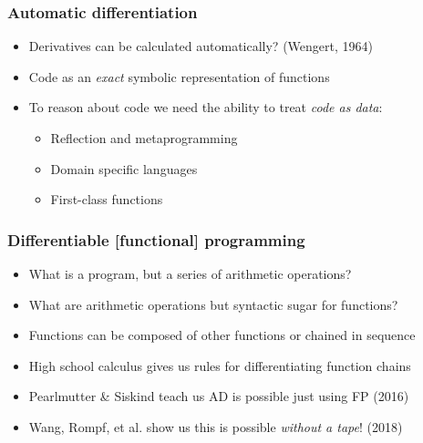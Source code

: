 \documentclass{beamer}
\begin{document}

    \begin{frame}
        \frametitle{Automatic differentiation}
        \begin{itemize}
            \item Derivatives can be calculated automatically? (Wengert, 1964)
            \item Code as an \textit{exact} symbolic representation of functions
            \item To reason about code we need the ability to treat \textit{code as data}:
            \begin{itemize}
                \item Reflection and metaprogramming
                \item Domain specific languages
                \item First-class functions
            \end{itemize}
        \end{itemize}
    \end{frame}


    \begin{frame}
        \frametitle{Differentiable [functional] programming}
        \begin{itemize}
            \item What is a program, but a series of arithmetic operations?
            \item What are arithmetic operations but syntactic sugar for functions?
            \item Functions can be composed of other functions or chained in sequence
            \item High school calculus gives us rules for differentiating function chains
            \item Pearlmutter \& Siskind teach us AD is possible just using FP (2016)
            \item Wang, Rompf, et al. show us this is possible \textit{without a tape}! (2018)
        \end{itemize}
    \end{frame}

\end{document}
